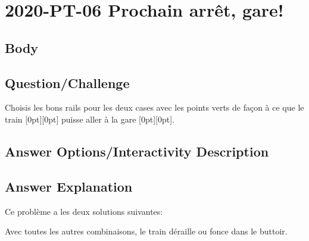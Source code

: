 \documentclass[a4paper,11pt]{report}
\newcommand{\taskGraphicsFolder}{..}
\begin{document}
\section*{\centering{} 2020-PT-06 Prochain arrêt, gare!}


\subsection*{Body}



{\em

\subsection*{Question/Challenge}

Choisis les bons rails pour les deux cases avec les points verts de façon à ce que le train \raisebox{-0.5ex}[0pt][0pt]{} puisse aller à la gare \raisebox{-0.5ex}[0pt][0pt]{}.

{\centering%
\par}

}\begingroup
\renewcommand{\arraystretch}{1.5}
\subsection*{Answer Options/Interactivity Description}



\endgroup

\subsection*{Answer Explanation}

Ce problème a les deux solutions suivantes:

{\centering%
\par}

{\centering%
\par}

Avec toutes les autres combinaisons, le train déraille ou fonce dans le buttoir.
\end{document}
